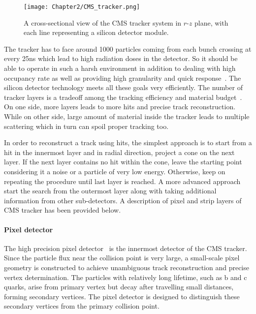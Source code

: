 \begin{figure}[h]
\begin{center}
\texttt{[image: Chapter2/CMS\_tracker.png]}
\caption{A cross-sectional view of the CMS tracker system in $r$-$z$ plane, with each line representing a silicon detector module.}
\label{fig:CMS_tracker}
\end{center}
\end{figure}
\vspace{-0.3in}

The tracker has to face around 1000 particles coming from each bunch crossing at every 25\unit{ns} which lead to high radiation doses in the detector. So it should
be able to operate in such a harsh environment in addition to dealing with high occupancy rate as well as providing high granularity and
quick response~\cite{Chatrchyan:2014fea}. The silicon detector technology meets all these goals very efficiently. 
The number of tracker layers is a tradeoff among the tracking efficiency and material budget~\cite{CMS:2010nua}.
On one side, more layers leads to more hits and precise track reconstruction. While on other side, large amount of
material inside the tracker leads to multiple scattering which in turn can spoil proper tracking too.

In order to reconstruct a track using hits, the simplest approach is to start from a hit in the innermost layer and in radial direction, project a cone on the next layer.
If the next layer contains no hit within the cone, leave the starting point considering it a noise or a particle of very low energy. Otherwise, keep on repeating the
procedure until last layer is reached. A more advanced approach start the search from the outermost layer along with taking additional information from other sub-detectors.
A description of pixel and strip layers of CMS tracker has been provided below.

\paragraph {\bf{Pixel detector}}
\hspace{\parindent} The high precision pixel detector~\cite{Baur:1999tw} is the innermost detector of the CMS tracker. Since the particle flux near
the collision point is very large, a small-scale pixel geometry is constructed to achieve unambiguous track reconstruction and precise vertex determination.
The particles with relatively long lifetime, such as b and c quarks, arise from primary vertex but decay after travelling small distances, forming secondary
vertices. The pixel detector is designed to distinguish these secondary vertices from the primary collision point.

